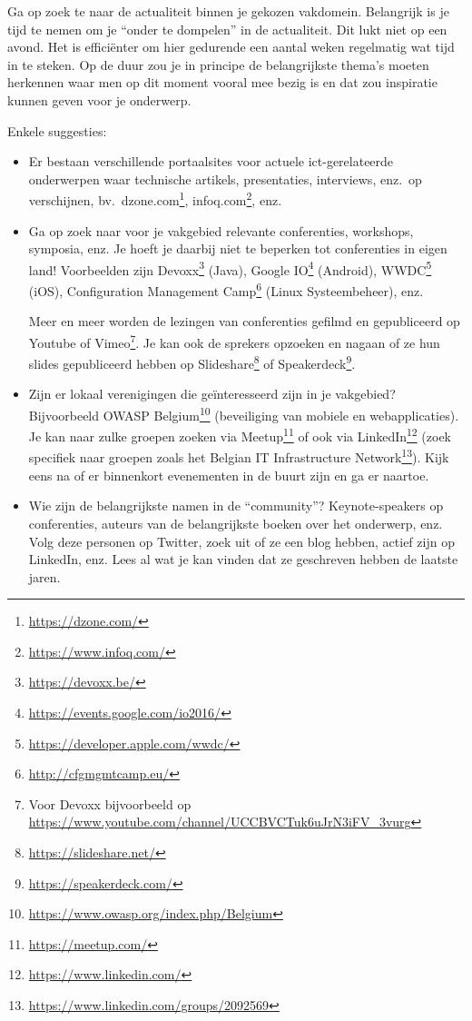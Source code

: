 Ga op zoek te naar de actualiteit binnen je gekozen vakdomein. Belangrijk is je tijd te nemen om je ``onder te dompelen'' in de actualiteit. Dit lukt niet op een avond. Het is efficiënter om hier gedurende een aantal weken regelmatig wat tijd in te steken. Op de duur zou je in principe de belangrijkste thema's moeten herkennen waar men op dit moment vooral mee bezig is en dat zou inspiratie kunnen geven voor je onderwerp.

Enkele suggesties:

\begin{itemize}
  \item Er bestaan verschillende portaalsites voor actuele ict-gerelateerde onderwerpen waar technische artikels, presentaties, interviews, enz.\ op verschijnen, bv.\ dzone.com\footnote{\url{https://dzone.com/}}, infoq.com\footnote{\url{https://www.infoq.com/}}, enz.

  \item Ga op zoek naar voor je vakgebied relevante conferenties, workshops, symposia, enz. Je hoeft je daarbij niet te beperken tot conferenties in eigen land! Voorbeelden zijn Devoxx\footnote{\url{https://devoxx.be/}} (Java), Google IO\footnote{\url{https://events.google.com/io2016/}} (Android), WWDC\footnote{\url{https://developer.apple.com/wwdc/}} (iOS), Configuration Management Camp\footnote{\url{http://cfgmgmtcamp.eu/}} (Linux Systeembeheer), enz.

  Meer en meer worden de lezingen van conferenties gefilmd en gepubliceerd op Youtube of Vimeo\footnote{Voor Devoxx bijvoorbeeld op \url{https://www.youtube.com/channel/UCCBVCTuk6uJrN3iFV\_3vurg}}. Je kan ook de sprekers opzoeken en nagaan of ze hun slides gepubliceerd hebben op Slideshare\footnote{\url{https://slideshare.net/}} of Speakerdeck\footnote{\url{https://speakerdeck.com/}}.

  \item Zijn er lokaal verenigingen die geïnteresseerd zijn in je vakgebied? Bijvoorbeeld OWASP Belgium\footnote{\url{https://www.owasp.org/index.php/Belgium}} (beveiliging van mobiele en webapplicaties). Je kan naar zulke groepen zoeken via Meetup\footnote{\url{https://meetup.com/}} of ook via LinkedIn\footnote{\url{https://www.linkedin.com/}} (zoek specifiek naar groepen zoals het Belgian IT Infrastructure Network\footnote{\url{https://www.linkedin.com/groups/2092569}}). Kijk eens na of er binnenkort evenementen in de buurt zijn en ga er naartoe.

  \item Wie zijn de belangrijkste namen in de ``community''? Keynote-speakers op conferenties, auteurs van de belangrijkste boeken over het onderwerp, enz. Volg deze personen op Twitter, zoek uit of ze een blog hebben, actief zijn op LinkedIn, enz. Lees al wat je kan vinden dat ze geschreven hebben de laatste jaren.


\end{itemize}
